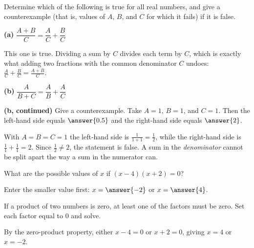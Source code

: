 \documentclass[12pt]{ximera}
\begin{document}
\begin{problem}
Determine which of the following is true for all real numbers, and give a
counterexample (that is, values of $A$, $B$, and $C$ for which it fails) if it is
false.

\begin{prompt}
\textbf{(a)} $\dfrac{A+B}{C} = \dfrac{A}{C} + \dfrac{B}{C}$

\begin{multipleChoice}
\end{multipleChoice}

\begin{feedback}
This one is true. Dividing a sum by $C$ divides each term by $C$, which is exactly
what adding two fractions with the common denominator $C$ undoes:
$\frac{A}{C}+\frac{B}{C}=\frac{A+B}{C}$.
\end{feedback}
\end{prompt}

\begin{prompt}
\textbf{(b)} $\dfrac{A}{B+C} = \dfrac{A}{B} + \dfrac{A}{C}$

\begin{multipleChoice}
\end{multipleChoice}
\end{prompt}

\begin{prompt}
\textbf{(b, continued)} Give a counterexample. Take $A=1$, $B=1$, and $C=1$. Then the
left-hand side equals $\answer{0.5}$ and the right-hand side equals $\answer{2}$.

\begin{feedback}
With $A=B=C=1$ the left-hand side is $\frac{1}{1+1}=\frac12$, while the right-hand
side is $\frac11+\frac11=2$. Since $\frac12\neq 2$, the statement is false. A sum in
the \emph{denominator} cannot be split apart the way a sum in the numerator can.
\end{feedback}
\end{prompt}
\end{problem}

\begin{problem}
What are the possible values of $x$ if $(x-4)(x+2)=0$?

Enter the smaller value first: $x = \answer{-2}$ or $x = \answer{4}$.

\begin{hint}
If a product of two numbers is zero, at least one of the factors must be zero.
Set each factor equal to $0$ and solve.
\end{hint}

\begin{feedback}
By the zero-product property, either $x-4=0$ or $x+2=0$, giving $x=4$ or $x=-2$.
\end{feedback}
\end{problem}
\end{document}
